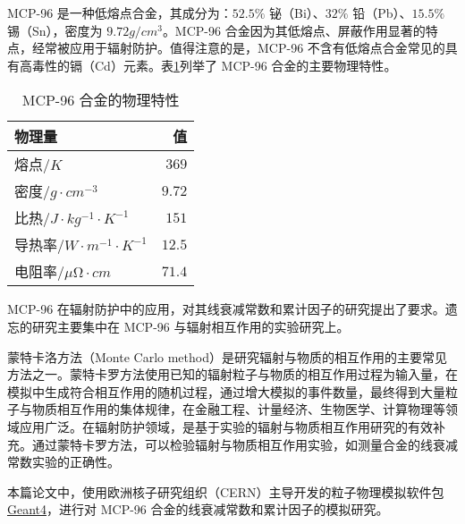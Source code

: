 MCP-96 是一种低熔点合金，其成分为：$52.5\%$ 铋（Bi）、$32\%$ 铅（Pb）、$15.5\%$ 锡（Sn），密度为 $9.72\si{g/cm^3}$。MCP-96 合金因为其低熔点、屏蔽作用显著的特点，经常被应用于辐射防护。值得注意的是，MCP-96 不含有低熔点合金常见的具有高毒性的镉（Cd）元素。表\ref{tab:mcp96}列举了 MCP-96 合金的主要物理特性\cite{hopkins_linear_2012}。

\begin{table}[H]
    \centering
    \caption{MCP-96 合金的物理特性}
    \label{tab:mcp96}
    \begin{tabular}{l|r}
    \toprule
    物理量 & 值 \\ 
    \hline
    熔点/$\si{K}$ & $369$ \\
    \hline
    密度/$\si{g\cdot cm^{-3}}$ & $9.72$ \\
    \hline
    比热/$\si{J\cdot kg^{-1}\cdot K^{-1}}$ & $151$ \\
    \hline
    导热率/$\si{W\cdot m^{-1}\cdot K^{-1}}$ & $12.5$ \\
    \hline
    电阻率/$\si{\mu\ohm\cdot cm}$ & $71.4$ \\
    \bottomrule
    \end{tabular}
\end{table}

MCP-96 在辐射防护中的应用，对其线衰减常数和累计因子的研究提出了要求。遗忘的研究主要集中在 MCP-96 与辐射相互作用的实验研究上\cite{hopkins_linear_2012}。

蒙特卡洛方法（Monte Carlo method）是研究辐射与物质的相互作用的主要常见方法之一。蒙特卡罗方法使用已知的辐射粒子与物质的相互作用过程为输入量，在模拟中生成符合相互作用的随机过程，通过增大模拟的事件数量，最终得到大量粒子与物质相互作用的集体规律，在金融工程、计量经济、生物医学、计算物理等领域应用广泛。在辐射防护领域，是基于实验的辐射与物质相互作用研究的有效补充。通过蒙特卡罗方法，可以检验辐射与物质相互作用实验，如测量合金的线衰减常数实验的正确性。

本篇论文中，使用欧洲核子研究组织（CERN）主导开发的粒子物理模拟软件包 \href{https://geant4.web.cern.ch/}{Geant4}\cite{agostinelli_geant4simulation_2003,allison_geant4_2006}，进行对 MCP-96 合金的线衰减常数和累计因子的模拟研究。